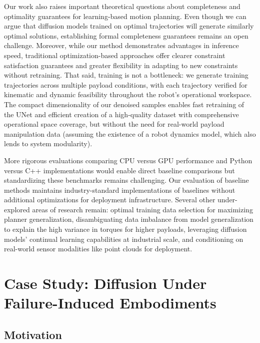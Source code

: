 Our work also raises important theoretical questions about completeness and optimality guarantees for learning-based motion planning. Even though we can argue that diffusion models trained on optimal trajectories will generate similarly optimal solutions, establishing formal completeness guarantees remains an open challenge.
Moreover, while our method demonstrates advantages in inference speed, traditional optimization-based approaches offer clearer constraint satisfaction guarantees and greater flexibility in adapting to new constraints without retraining. That said, training is not a bottleneck: we generate training trajectories across multiple payload conditions, with each trajectory verified for kinematic and dynamic feasibility throughout the robot's operational workspace. The compact dimensionality of our denoised samples enables fast retraining of the UNet and efficient creation of a high-quality dataset with comprehensive operational space coverage, but without the need for real-world payload manipulation data (assuming the existence of a robot dynamics model, which also lends to system modularity).

More rigorous evaluations comparing CPU versus GPU performance and Python versus C++ implementations would enable direct baseline comparisons but standardizing these benchmarks remains challenging. Our evaluation of baseline methods maintains industry-standard implementations of baselines without additional optimizations for deployment infrastructure.
Several other under-explored areas of research remain: optimal training data selection for maximizing planner generalization, disambiguating data imbalance from model generalization to explain the high variance in torques for higher payloads, leveraging diffusion models' continual learning capabilities at industrial scale, and conditioning on real-world sensor modalities like point clouds for deployment.

\section{Case Study: Diffusion Under Failure-Induced Embodiments}
\label{ch:failures}

\subsection{Motivation}
\label{sec:failures:revisit}

